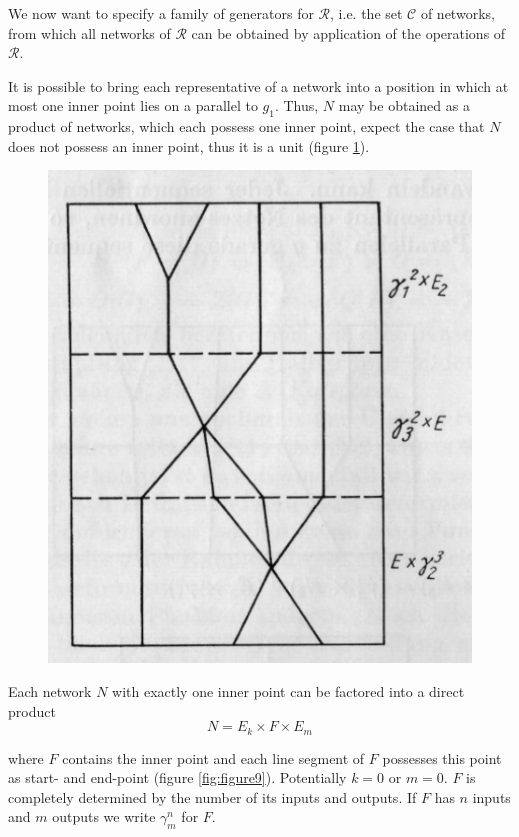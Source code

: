 \documentclass{article}
\begin{document}
We now want to specify a family of generators for $\mathcal{R}$, i.e. the set $\mathcal{C}$ of networks, from which all networks of $\mathcal{R}$ can be obtained by application of the operations of $\mathcal{R}$.

It is possible to bring each representative of a network into a position in which at most one inner point lies on a parallel to $g_1$. Thus, $N$ may be obtained as a product of networks, which each possess one inner point, expect the case that $N$ does not possess an inner point, thus it is a unit (figure \ref{fig:figure8}).

\begin{figure}
\includegraphics[]{figure8.png}
  \centering
\caption{}
\label{fig:figure8}
\end{figure}

Each network $N$ with exactly one inner point can be factored into a direct product 
\[
N = E_k \times F \times E_m
\]

where $F$ contains the inner point and each line segment of $F$ possesses this point as start- and end-point (figure \ref{fig:figure9}). Potentially $k = 0$ or $m = 0$. $F$ is completely determined by the number of its inputs and outputs. If $F$ has $n$ inputs and $m$ outputs we write $\gamma_m^n$ for $F$.
\end{document}
